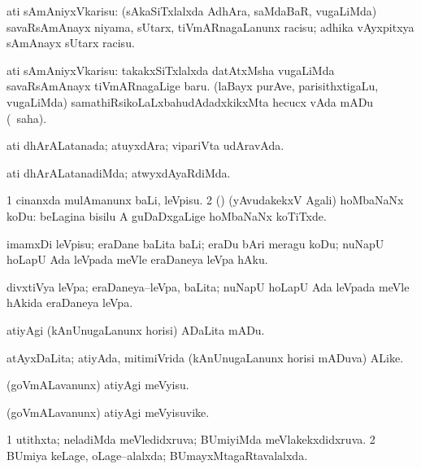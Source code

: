 \bentry
{}
\gl{\sakirx}
\bmng
ati sAmAniyxVkarisu: (sAkaSiTxlalxda AdhAra, saMdaBaR, \mo vugaLiMda) savaRsAmAnayx niyama, sUtarx, tiVmARnagaLanunx racisu; adhika vAyxpitxya sAmAnayx sUtarx racisu. 
\emng

\noindent
\gl{\akirx}
\bmng
ati sAmAniyxVkarisu: 
\banum
{} takakxSiTxlalxda datAtxMsha \mo vugaLiMda savaRsAmAnayx tiVmARnagaLige baru. 
 (laBayx purAve, parisithxtigaLu, \mo vugaLiMda) samathiRsikoLaLxbahudAdadxkikxMta hecucx vAda mADu (\sakirx\ saha). 
\eanum
\emng
\eentry


\bentry
{}
\gl{\gu}
\bmng
ati dhArALatanada; atuyxdAra; vipariVta udAravAda. 
\emng
\eentry

\bentry
{}
\gl{\kirxvi}
\bmng
ati dhArALatanadiMda; atwyxdAyaRdiMda. 
\emng
\eentry

\bentry
{}
\gl{\sakirx}
\bmng
\bnum
\num{1} cinanxda mulAmanunx baLi, leVpisu. 
\num{2} (\rUpa) (yAvudakekxV Agali) hoMbaNaNx koDu:  beLagina bisilu A guDaDxgaLige hoMbaNaNx koTiTxde. 
\enum
\emng
\eentry

\bentry
{}
\gl{\sakirx}
\bmng
imamxDi leVpisu; eraDane baLita baLi; eraDu bAri meragu koDu; nuNapU hoLapU Ada leVpada meVle eraDaneya leVpa hAku. 
\emng
\eentry

\bentry
{}
\gl{\nA}
\bmng
divxtiVya leVpa; eraDaneya--leVpa, baLita; nuNapU hoLapU Ada leVpada meVle hAkida eraDaneya leVpa. 
\emng
\eentry


\bentry
{}
\gl{\sakirx}
\bmng
atiyAgi (kAnUnugaLanunx horisi) ADaLita mADu. 
\emng
\eentry

\bentry
{}
\gl{\nA}
\bmng
atAyxDaLita; atiyAda, mitimiVrida (kAnUnugaLanunx horisi mADuva) ALike. 
\emng
\eentry


\bentry
{}
\gl{\sakirx}
\bmng
(goVmALavanunx) atiyAgi meVyisu. 
\emng
\eentry


\bentry
{}
\gl{\nA}
\bmng
(goVmALavanunx) atiyAgi meVyisuvike. 
\emng
\eentry


\bentry
{}
\gl{\gu}
\bmng
\bnum
\num{1} utithxta; neladiMda meVledidxruva; BUmiyiMda meVlakekxdidxruva. 
\num{2} BUmiya keLage, oLage--alalxda; BUmayxMtagaRtavalalxda. 
\enum
\emng
\eentry


